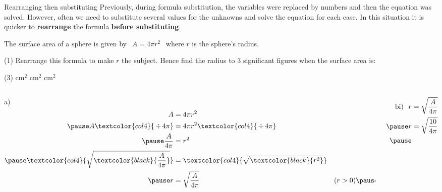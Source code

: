 \documentclass[aspectratio=169,10pt]{beamer}
\begin{document}
\begin{frame}{Rearranging then substituting}
Previously, during formula substitution, the variables were replaced by numbers and then the equation was solved. However, often we need to substitute several values for the unknowns and solve the equation for each case. In this situation it is quicker to \textbf{rearrange} the formula \textbf{before substituting}.
\end{frame}

\begin{frame}
\small
  \begin{example}
    The surface area of a sphere is given by $\ \ A=4\pi r^2\ \ $ where $r$ is the sphere's radius.
    \begin{tasks}(1)
      \task Rearrange this formula to make $r$ the subject.
      \task Hence find the radius to 3 significant figures when the surface area is:
    \end{tasks}
    \begin{tasks}(3)
         cm$^2$
         cm$^2$
         cm$^2$
    \end{tasks}
  \end{example}\pause
  \begin{solution}[]
  \vspace{-1em}
    \begin{columns}[t]
      \begin{column}{.22\textwidth}
      a)\vspace{-2em}
        \[
        \begin{aligned}
          A&=4\pi r^2\\\pause
          A\textcolor{col4}{\,\div\,4\pi}&=4\pi r^2\textcolor{col4}{\,\div\,4\pi}\\\pause
          \frac{A}{4\pi}&=r^2\\\pause
          \textcolor{col4}{\sqrt{\textcolor{black}{\frac{A}{4\pi}}}}&=\textcolor{col4}{\sqrt{\textcolor{black}{r^2}}}\\\pause
          r&=\sqrt{\frac{A}{4\pi}}&(r>0)\pause
        \end{aligned}
        \]
      \end{column}
      \begin{column}{.2\textwidth}
        \vspace{-2em}
        \[
        \begin{aligned}
          \text{bi) }\  r&=\sqrt{\frac{A}{4\pi}}\\\pause
          r&=\sqrt{\frac{10}{4\pi}}\\\pause

\end{aligned}\]
\end{column}
\end{columns}
\end{solution}
\end{frame}
\end{document}
